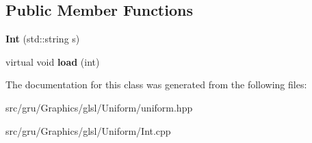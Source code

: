 \subsection*{\-Public \-Member \-Functions}
\begin{DoxyCompactItemize}
\item 
\hypertarget{classglutpp_1_1glsl_1_1Uniform_1_1Scalar_1_1Int_a7135bbb159a751607c04fe512ffe1533}{{\bfseries \-Int} (std\-::string s)}\label{classglutpp_1_1glsl_1_1Uniform_1_1Scalar_1_1Int_a7135bbb159a751607c04fe512ffe1533}

\item 
\hypertarget{classglutpp_1_1glsl_1_1Uniform_1_1Scalar_1_1Int_a2b305a726c152de60547518b9ed48a2a}{virtual void {\bfseries load} (int)}\label{classglutpp_1_1glsl_1_1Uniform_1_1Scalar_1_1Int_a2b305a726c152de60547518b9ed48a2a}

\end{DoxyCompactItemize}


\-The documentation for this class was generated from the following files\-:\begin{DoxyCompactItemize}
\item 
src/gru/\-Graphics/glsl/\-Uniform/uniform.\-hpp\item 
src/gru/\-Graphics/glsl/\-Uniform/\-Int.\-cpp\end{DoxyCompactItemize}
